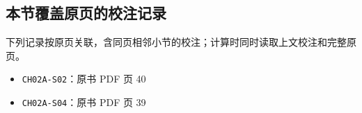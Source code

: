 \documentclass[
  10pt,
  fontset=fandol]{ctexart}
\providecommand{\tightlist}{%
  \setlength{\itemsep}{0pt}\setlength{\parskip}{0pt}}
\begin{document}
\subsection{本节覆盖原页的校注记录}\label{ux672cux8282ux8986ux76d6ux539fux9875ux7684ux6821ux6ce8ux8bb0ux5f55}

下列记录按原页关联，含同页相邻小节的校注；计算时同时读取上文校注和完整原页。

\begin{itemize}
\tightlist
\item
  \texttt{CH02A-S02}：原书 PDF 页 40
\item
  \texttt{CH02A-S04}：原书 PDF 页 39
\end{itemize}
\end{document}
